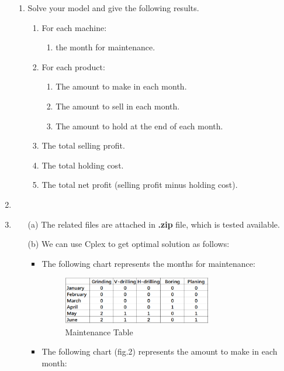 \documentclass[12pt,a4paper]{article}
\makeatletter
\newtheorem*{solution}{Solution}
\theoremstyle{definition}
\renewenvironment{solution}[1][Solution] {\par\pushQED{\qed}\normalfont\topsep6\p@\@plus6\p@\relax\trivlist\item[\hskip\labelsep\bfseries#1\@addpunct{.}]\ignorespaces}{\popQED\endtrivlist\@endpefalse} \makeatother
\makeatother
\begin{document}
\begin{enumerate}
\begin{enumerate}
		\item
		Solve your model and give the following results.
		\begin{enumerate}
			\item
			For each machine:
			\begin{enumerate}
				\item
				the month for maintenance.
			\end{enumerate}
			\item
			For each product:
			\begin{enumerate}
				\item
				The amount to make in each month.
				\item
				The amount to sell in each month.
				\item
				The amount to hold at the end of each month.
			\end{enumerate}
			\item
			The total selling profit.
			\item
			The total holding cost.
			\item
			The total net profit (selling profit minus holding cost).
		\end{enumerate}
	\end{enumerate}

\begin{solution}\item
	\renewcommand{\qedsymbol}{}
	\begin{itemize}
		\item [(a)] The related files are attached in \textbf{.zip} file, which is tested available.
		\item [(b)] We can use Cplex to get optimal solution as follows:
		\begin{itemize}
			\item The following chart represents the months for maintenance:
			
			\begin{figure}[h]
			\centering
			\includegraphics[width=0.7\textwidth]{1.png}
				\caption{Maintenance Table}
		  \end{figure}
	  
	  
			\item  The following chart (fig.2) represents the amount to make in each month:
			

\end{itemize}
\end{itemize}
\end{solution}
\end{enumerate}
\end{document}
